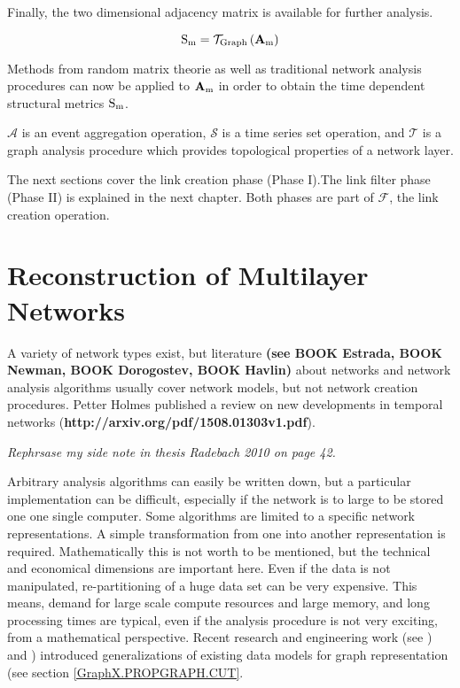 \documentclass[a4paper,10pt]{scrbook}
\begin{document}
Finally, the two dimensional adjacency matrix is available for further analysis. 

\begin{equation}
{\rm S_{m}}= \mathcal{T}_{\rm {Graph}} \left( {\rm \textbf{A}_m} \right) 
\label{eq.SM}
\end{equation}

Methods from random matrix theorie \cite{Plerou2002} as well as traditional network analysis procedures can now be applied to ${\rm \textbf{A}_m}$ in order to obtain the time dependent structural metrics ${\rm S_{m}}$.

$\mathcal{A}$ is an event aggregation operation,
$\mathcal{S}$ is a time series set operation, and $\mathcal{T}$ is a graph analysis procedure which provides topological properties of a network layer.

The next sections cover the link creation phase (Phase I).The link filter phase (Phase II) is explained in the next chapter. Both phases are part of $\mathcal{F}$, the link creation operation. 

\clearpage
\newpage

\section{Reconstruction of Multilayer Networks}
\label{chap.CREATION}

A variety of network types exist, but literature \textbf{(see BOOK Estrada, BOOK Newman, BOOK Dorogostev, BOOK Havlin)} about networks and network analysis algorithms usually cover network models, but not network creation procedures. Petter Holmes published a review on new developments in temporal networks (\textbf{http://arxiv.org/pdf/1508.01303v1.pdf}). 

\textit{Rephrsase my side note in thesis Radebach 2010 on page 42.}


Arbitrary analysis algorithms can easily be written down, but a particular implementation can be difficult, especially if the network is to large to be stored one one single computer. Some algorithms are limited to a specific network representations. A simple transformation from one into another representation is required. Mathematically this is not worth to be mentioned, but the technical and economical dimensions are important here. Even if the data is not manipulated, re-partitioning of a huge data set can be very expensive. This means, demand for large scale compute resources and large memory, and long processing times are typical, even if the analysis procedure is not very exciting, from a mathematical perspective. 
Recent research and engineering work (see \cite{Google.Pregel}) and \cite{GraphX}) introduced generalizations of existing data models for graph representation (see section \ref{GraphX.PROPGRAPH.CUT}. 
\end{document}
